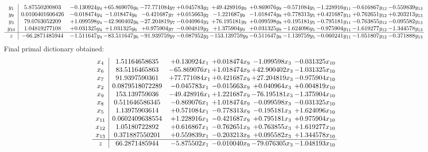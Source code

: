 \documentclass[11pt]{article}
\begin{document}
\[\begin{array}{c| c c@{\hskip 2pt} c@{\hskip 2pt} c@{\hskip 2pt} c@{\hskip 2pt} c@{\hskip 2pt} c@{\hskip 2pt} c@{\hskip 2pt} c@{\hskip 2pt} c@{\hskip 2pt} c@{\hskip 2pt} }
 y_{1}   &  5.87550200803 & -0.130924 y_{4} & + 65.869076 y_{6} & -77.771084 y_{7} & + 0.045783 y_{2} & + 49.428916 y_{9} & + 0.869076 y_{8} & -0.571084 y_{5} & -1.228916 y_{11} & -0.616867 y_{12} & -0.559839 y_{13}\\
 y_{9}   &  0.0100401606426 & -0.018474 y_{4} & -1.018474 y_{6} & -0.421687 y_{7} & + 0.015663 y_{2} & -1.221687 y_{9} & -1.018474 y_{8} & + 0.778313 y_{5} & + 0.421687 y_{11} & + 0.762651 y_{12} & + 0.203213 y_{13}\\
 y_{3}   &  79.0763052209 & + 1.099598 y_{4} & -42.900402 y_{6} & -27.204819 y_{7} & -0.040964 y_{2} & + 76.195181 y_{9} & + 0.099598 y_{8} & + 0.195181 y_{5} & -0.795181 y_{11} & -0.763855 y_{12} & -0.095582 y_{13}\\
 y_{10}   &  1.04819277108 & + 0.031325 y_{4} & + 1.031325 y_{6} & + 0.975904 y_{7} & -0.004819 y_{2} & + 1.375904 y_{9} & + 0.031325 y_{8} & -1.624096 y_{5} & -0.975904 y_{11} & -1.619277 y_{12} & -1.344578 y_{13}\\
\hline
z    &  -66.2871485944 & -1.511647 y_{4} & -83.511647 y_{6} & -91.939759 y_{7} & -0.087952 y_{2} & -153.139759 y_{9} & -0.511647 y_{8} & -1.139759 y_{5} & -0.060241 y_{11} & -1.051807 y_{12} & -0.371888 y_{13}\\
\end{array}\]
 Final primal dictionary obtained: 
\[\begin{array}{c| c c@{\hskip 2pt} c@{\hskip 2pt} c@{\hskip 2pt} c@{\hskip 2pt} }
 x_{4}   &  1.51164658635 & + 0.130924 x_{1} & + 0.018474 x_{9} & -1.099598 x_{3} & -0.031325 x_{10}\\
 x_{6}   &  83.5116465863 & -65.869076 x_{1} & + 1.018474 x_{9} & + 42.900402 x_{3} & -1.031325 x_{10}\\
 x_{7}   &  91.9397590361 & + 77.771084 x_{1} & + 0.421687 x_{9} & + 27.204819 x_{3} & -0.975904 x_{10}\\
 x_{2}   &  0.0879518072289 & -0.045783 x_{1} & -0.015663 x_{9} & + 0.040964 x_{3} & + 0.004819 x_{10}\\
 x_{9}   &  153.139759036 & -49.428916 x_{1} & + 1.221687 x_{9} & -76.195181 x_{3} & -1.375904 x_{10}\\
 x_{8}   &  0.511646586345 & -0.869076 x_{1} & + 1.018474 x_{9} & -0.099598 x_{3} & -0.031325 x_{10}\\
 x_{5}   &  1.13975903614 & + 0.571084 x_{1} & -0.778313 x_{9} & -0.195181 x_{3} & + 1.624096 x_{10}\\
 x_{11}   &  0.0602409638554 & + 1.228916 x_{1} & -0.421687 x_{9} & + 0.795181 x_{3} & + 0.975904 x_{10}\\
 x_{12}   &  1.05180722892 & + 0.616867 x_{1} & -0.762651 x_{9} & + 0.763855 x_{3} & + 1.619277 x_{10}\\
 x_{13}   &  0.371887550201 & + 0.559839 x_{1} & -0.203213 x_{9} & + 0.095582 x_{3} & + 1.344578 x_{10}\\
\hline
z    &  66.2871485944 & -5.875502 x_{1} & -0.010040 x_{9} & -79.076305 x_{3} & -1.048193 x_{10}\\
\end{array}\]
\end{document}
